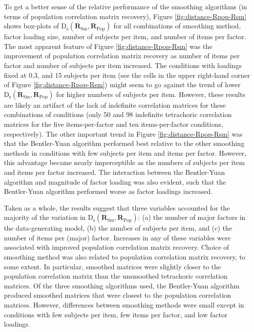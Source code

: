 \documentclass[
  english,
  man]{apa6}
\begin{document}
To get a better sense of the relative performance of the smoothing algorithms (in terms of population correlation matrix recovery), Figure \ref{fig:distance-Rpop-Rsm} shows box-plots of \(\mathrm{D}_{\mathrm{s}}(\mathbf{R}_{\textrm{Sm}}, \mathbf{R}_{\textrm{Pop}})\) for all combinations of smoothing method, factor loading size, number of subjects per item, and number of items per factor. The most apparent feature of Figure \ref{fig:distance-Rpop-Rsm} was the improvement of population correlation matrix recovery as number of items per factor and number of subjects per item increased. The conditions with loadings fixed at 0.3, and 15 subjects per item (see the cells in the upper right-hand corner of Figure \ref{fig:distance-Rpop-Rsm}) might seem to go against the trend of lower \(\mathrm{D}_{\mathrm{s}}(\mathbf{R}_{\textrm{Sm}}, \mathbf{R}_{\textrm{Pop}})\) for higher numbers of subjects per item. However, these results are likely an artifact of the lack of indefinite correlation matrices for these combinations of conditions (only 50 and 98 indefinite tetrachoric correlation matrices for the five items-per-factor and ten items-per-factor conditions, respectively). The other important trend in Figure \ref{fig:distance-Rpop-Rsm} was that the Bentler-Yuan algorithm performed best relative to the other smoothing methods in conditions with few subjects per item and items per factor. However, this advantage became nearly imperceptible as the numbers of subjects per item and items per factor increased. The interaction between the Bentler-Yuan algorithm and magnitude of factor loading was also evident, such that the Bentler-Yuan algorithm performed worse as factor loadings increased.

Taken as a whole, the results suggest that three variables accounted for the majority of the variation in \(\mathrm{D}_{\mathrm{s}}(\mathbf{R}_{\textrm{Sm}}, \mathbf{R}_{\textrm{Pop}})\): (a) the number of major factors in the data-generating model, (b) the number of subjects per item, and (c) the number of items per (major) factor. Increases in any of these variables were associated with improved population correlation matrix recovery. Choice of smoothing method was also related to population correlation matrix recovery, to some extent. In particular, smoothed matrices were slightly closer to the population correlation matrix than the unsmoothed tetrachoric correlation matrices. Of the three smoothing algorithms used, the Bentler-Yuan algorithm produced smoothed matrices that were closest to the population correlation matrices. However, differences between smoothing methods were small except in conditions with few subjects per item, few items per factor, and low factor loadings.
\end{document}
